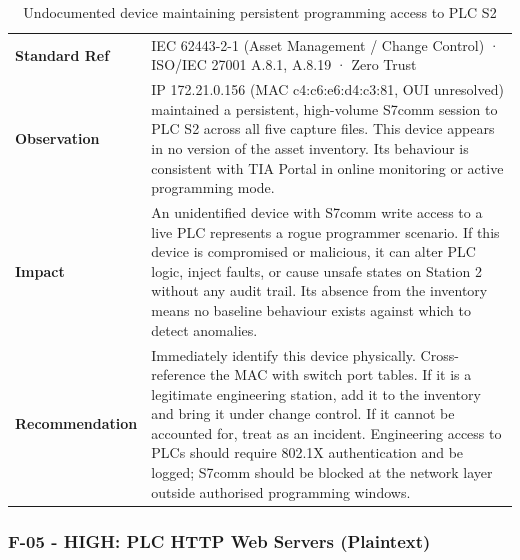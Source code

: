 \begin{table}[H]
\centering
\begin{tabular}{@{}p{}p{}@{}}
\toprule
\textbf{Standard Ref} & IEC 62443-2-1 (Asset Management / Change Control) · ISO/IEC 27001 A.8.1, A.8.19 · Zero Trust \\
\textbf{Observation} & IP 172.21.0.156 (MAC c4:c6:e6:d4:c3:81, OUI unresolved) maintained a persistent, high-volume S7comm session to PLC S2 across all five capture files. This device appears in no version of the asset inventory. Its behaviour is consistent with TIA Portal in online monitoring or active programming mode. \\
\textbf{Impact} & An unidentified device with S7comm write access to a live PLC represents a rogue programmer scenario. If this device is compromised or malicious, it can alter PLC logic, inject faults, or cause unsafe states on Station 2 without any audit trail. Its absence from the inventory means no baseline behaviour exists against which to detect anomalies. \\
\textbf{Recommendation} & Immediately identify this device physically. Cross-reference the MAC with switch port tables. If it is a legitimate engineering station, add it to the inventory and bring it under change control. If it cannot be accounted for, treat as an incident. Engineering access to PLCs should require 802.1X authentication and be logged; S7comm should be blocked at the network layer outside authorised programming windows. \\
\bottomrule
\end{tabular}
\caption{Undocumented device maintaining persistent programming access to PLC S2}
\end{table}

\subsubsection{F-05 - HIGH: PLC HTTP Web Servers (Plaintext)}

